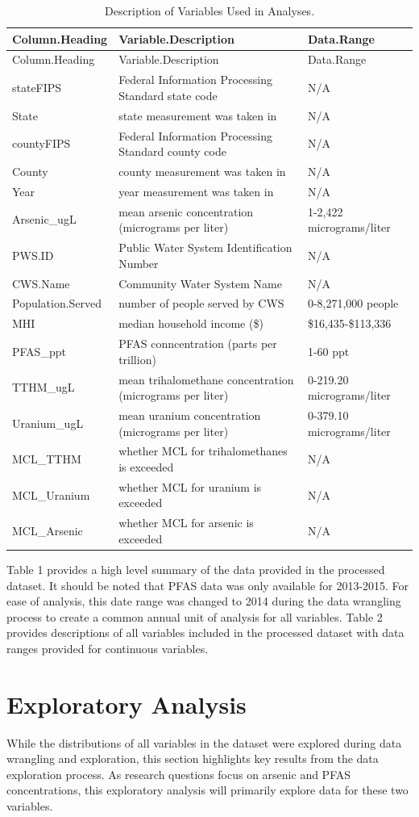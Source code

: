 \documentclass[12pt,]{article}
\begin{document}
\begin{longtable}[]{@{}lll@{}}
\caption{Description of Variables Used in Analyses.}\tabularnewline
\toprule
Column.Heading & Variable.Description & Data.Range\tabularnewline
\midrule
\endfirsthead
\toprule
Column.Heading & Variable.Description & Data.Range\tabularnewline
\midrule
\endhead
stateFIPS & Federal Information Processing Standard state code &
N/A\tabularnewline
State & state measurement was taken in & N/A\tabularnewline
countyFIPS & Federal Information Processing Standard county code &
N/A\tabularnewline
County & county measurement was taken in & N/A\tabularnewline
Year & year measurement was taken in & N/A\tabularnewline
Arsenic\_ugL & mean arsenic concentration (micrograms per liter) &
1-2,422 micrograms/liter\tabularnewline
PWS.ID & Public Water System Identification Number & N/A\tabularnewline
CWS.Name & Community Water System Name & N/A\tabularnewline
Population.Served & number of people served by CWS & 0-8,271,000
people\tabularnewline
MHI & median household income (\$) & \$16,435-\$113,336\tabularnewline
PFAS\_ppt & PFAS conncentration (parts per trillion) & 1-60
ppt\tabularnewline
TTHM\_ugL & mean trihalomethane concentration (micrograms per liter) &
0-219.20 micrograms/liter\tabularnewline
Uranium\_ugL & mean uranium concentration (micrograms per liter) &
0-379.10 micrograms/liter\tabularnewline
MCL\_TTHM & whether MCL for trihalomethanes is exceeded &
N/A\tabularnewline
MCL\_Uranium & whether MCL for uranium is exceeded & N/A\tabularnewline
MCL\_Arsenic & whether MCL for arsenic is exceeded & N/A\tabularnewline
\bottomrule
\end{longtable}

Table 1 provides a high level summary of the data provided in the
processed dataset. It should be noted that PFAS data was only available
for 2013-2015. For ease of analysis, this date range was changed to 2014
during the data wrangling process to create a common annual unit of
analysis for all variables. Table 2 provides descriptions of all
variables included in the processed dataset with data ranges provided
for continuous variables.

\newpage

\hypertarget{exploratory-analysis}{%
\section{Exploratory Analysis}\label{exploratory-analysis}}

While the distributions of all variables in the dataset were explored
during data wrangling and exploration, this section highlights key
results from the data exploration process. As research questions focus
on arsenic and PFAS concentrations, this exploratory analysis will
primarily explore data for these two variables.
\end{document}
